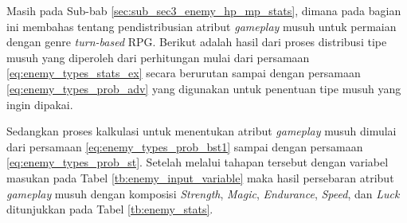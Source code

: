 Masih pada Sub-bab \ref{sec:sub_sec3_enemy_hp_mp_stats}, dimana pada bagian ini membahas tentang pendistribusian atribut \textit{gameplay} musuh untuk permaian dengan genre \textit{turn-based} RPG. Berikut adalah hasil dari proses distribusi tipe musuh yang diperoleh dari perhitungan mulai dari persamaan \ref{eq:enemy_types_stats_ex} secara berurutan sampai dengan persamaan \ref{eq:enemy_types_prob_adv} yang digunakan untuk penentuan tipe musuh yang ingin dipakai. 
\vspace{1ex}

Sedangkan proses kalkulasi untuk menentukan atribut \textit{gameplay} musuh dimulai dari persamaan \ref{eq:enemy_types_prob_bst1} sampai dengan persamaan \ref{eq:enemy_types_prob_st}. Setelah melalui tahapan tersebut dengan variabel masukan pada Tabel \ref{tb:enemy_input_variable} maka hasil persebaran atribut \textit{gameplay} musuh dengan komposisi \textit{Strength}, \textit{Magic}, \textit{Endurance}, \textit{Speed}, dan \textit{Luck} ditunjukkan pada Tabel \ref{tb:enemy_stats}.
\vspace{-1ex}

